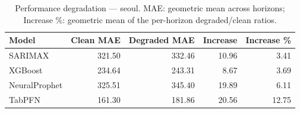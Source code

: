 \begin{table}[h]
\centering
\caption{Performance degradation — seoul. MAE: geometric mean across horizons; Increase \%: geometric mean of the per-horizon degraded/clean ratios.}
\label{tab:degradation_summary_seoul}
\begin{tabular}{lrrrr}
\toprule
Model & Clean MAE & Degraded MAE & Increase & Increase \% \\
\midrule
SARIMAX & 321.50 & 332.46 & 10.96 & 3.41 \\
XGBoost & 234.64 & 243.31 & 8.67 & 3.69 \\
NeuralProphet & 325.51 & 345.40 & 19.89 & 6.11 \\
TabPFN & 161.30 & 181.86 & 20.56 & 12.75 \\
\bottomrule
\end{tabular}
\end{table}
